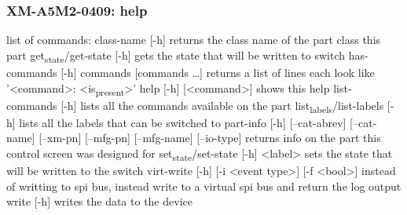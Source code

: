 \documentclass[11pt]{article}
\begin{document}
\subsubsection{XM-A5M2-0409: help}
\label{sec:orgdcbac71}
list of commands:
  class-name [-h]
    returns the class name of the part class this part
  get\textsubscript{state}/get-state [-h]
    gets the state that will be written to switch
  has-commands [-h] commands [commands \ldots{}]
    returns a list of lines each look like '<command>: <is\textsubscript{present}>'
  help [-h] [<command>]
    shows this help
  list-commands [-h]
    lists all the commands available on the part
  list\textsubscript{labels}/list-labels [-h]
    lists all the labels that can be switched to
  part-info  [-h] [--cat-abrev] [--cat-name] [--xm-pn] [--mfg-pn] [--mfg-name]
          [--io-type]
    returns info on the part this control screen was designed for
  set\textsubscript{state}/set-state [-h] <label>
    sets the state that will be written to the switch
  virt-write [-h] [-i <event type>] [-f <bool>]
    instead of writting to spi bus, instead write to a virtual spi bus
    and return the log output
  write [-h]
    writes the data to the device
\end{document}
